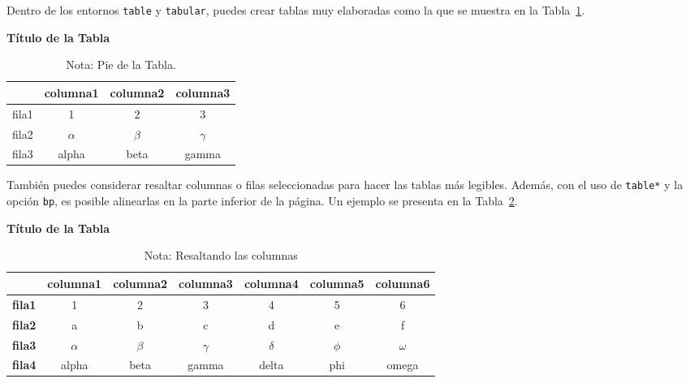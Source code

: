 \documentclass[11pt,a4paper]{article}
\begin{document}
Dentro de los entornos \texttt{table} y \texttt{tabular}, puedes crear tablas muy elaboradas como la que se muestra en la Tabla~\ref{table:example}.

\begin{table}[htb]
    \caption{\textbf{Título de la Tabla}}
    \centering 
    \begin{tabular}{cccc}
    \hline
    \textbf{} & \textbf{columna1} & \textbf{columna2} & \textbf{columna3} \\
    \hline 
    fila1 & 1 & 2 & 3 \\
    fila2 & $\alpha$ & $\beta$ & $\gamma$ \\
    fila3 & alpha & beta & gamma \\
    \hline
    \end{tabular}
    \vspace{6pt} %
    \caption*{Nota: Pie de la Tabla.}
    \label{table:example}
\end{table}

También puedes considerar resaltar columnas o filas seleccionadas para hacer las tablas más legibles. Además, con el uso de \texttt{table*} y la opción \texttt{bp}, es posible alinearlas en la parte inferior de la página. Un ejemplo se presenta en la Tabla~\ref{table:exampleC}.

\begin{table}[htb]
    \caption{\textbf{Título de la Tabla}}
    \centering 
    \begin{tabular}{|p{3em} | c | c | c | c | c | c|}
    \hline
     & \textbf{columna1} & \textbf{columna2} & \textbf{columna3} & \textbf{columna4} & \textbf{columna5} & \textbf{columna6} \T\B \\
    \hline
    \textbf{fila1} & 1 & 2 & 3 & 4 & 5 & 6 \T\B\\
    \textbf{fila2} & a & b & c & d & e & f \T\B\\
    \textbf{fila3} & $\alpha$ & $\beta$ & $\gamma$ & $\delta$ & $\phi$ & $\omega$ \T\B\\
    \textbf{fila4} & alpha & beta & gamma & delta & phi & omega \B\\
    \hline
    \end{tabular}
    \vspace{6pt} %
    \caption*{Nota: Resaltando las columnas}
    \label{table:exampleC}
\end{table}
\end{document}
